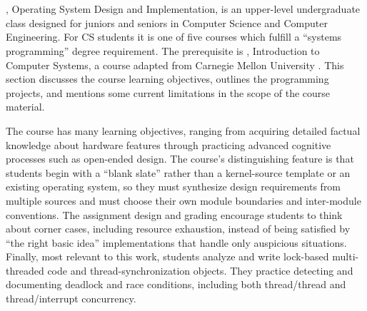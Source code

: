 \section{\fourten}
\label{sec:410}

\fourten, Operating System Design and Implementation,
is an upper-level undergraduate class
designed for juniors and seniors in Computer Science
and Computer Engineering.
For CS students it is one of five courses which fulfill
a ``systems programming'' degree requirement.
%
The prerequisite is \twothirteen,
Introduction to Computer Systems,
a course adapted from Carnegie Mellon University %
\cite{sigcse01:CSaPP}.
This section discusses the course learning objectives,
outlines the programming projects,
and mentions some current limitations in the scope
of the course material.

The course has many learning objectives,
ranging from acquiring detailed factual knowledge about
hardware features
through practicing advanced cognitive processes
such as open-ended design.
%
The course's distinguishing feature is that
students begin with a ``blank slate'' rather than a
kernel-source template or an existing operating system,
so they must synthesize design requirements from multiple sources
and must
choose their own module boundaries and inter-module conventions.
%
The assignment design and grading encourage students to
think about corner cases, including resource exhaustion,
instead of being satisfied by
``the right basic idea''
implementations that handle only auspicious situations.
%
Finally, most relevant to this work,
students %
analyze and write lock-based multi-threaded code and
thread-synchronization objects.
They practice detecting and documenting deadlock and race conditions,
including both thread/thread
and thread/interrupt concurrency.


